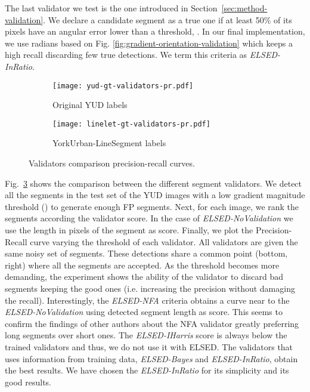 \documentclass[preprint,12pt]{elsarticle}
\begin{document}
The last validator we test is the one introduced in Section~\ref{sec:method-validation}.
We declare a candidate segment as a true one if at least 50\% of its pixels have an angular error lower than a threshold, . In our final implementation, we use  radians based on Fig. \ref{fig:gradient-orientation-validation} which keeps a high recall discarding few true detections. 
We term this criteria as \emph{ELSED-InRatio}.
\begin{figure}
    \centering
    \begin{subfigure}{0.49\textwidth}
        \centering
        \texttt{[image: yud-gt-validators-pr.pdf]}
        \label{fig:label:validation-criteria-original-yud}
        \caption{Original YUD labels}
    \end{subfigure}
    \begin{subfigure}{0.49\textwidth}
        \centering
        \texttt{[image: linelet-gt-validators-pr.pdf]}
        \label{fig:validation-criteria-original-linelet}
        \caption{YorkUrban-LineSegment labels}
    \end{subfigure}
    \caption{Validators comparison precision-recall curves.}
    \label{fig:validation-criteria-precision-recall}
\end{figure}

Fig.~\ref{fig:validation-criteria-precision-recall} shows the comparison between the different segment validators. We detect all the segments in the test set of the YUD images with a low gradient magnitude threshold () to generate enough FP segments. Next, for each image, we rank the segments according the validator score. In the case of \emph{ELSED-NoValidation} we use the length in pixels of the segment as score. Finally, we plot the Precision-Recall curve varying the threshold of each validator. 
All validators are given the same noisy set of segments. These detections share a common point (bottom, right) where all the segments are accepted. As the threshold becomes more demanding, the experiment shows the ability of the validator to discard bad segments keeping the good ones (i.e. increasing the precision without damaging the recall).
Interestingly, the \emph{ELSED-NFA} criteria obtains a curve near to the \emph{ELSED-NoValidation} using detected segment length as score. This seems to confirm the findings of other authors about the NFA validator greatly preferring long segments over short ones.
The \emph{ELSED-IHarris} score is always below the trained validators and thus, we do not use it with ELSED. 
The validators that uses information from training data, \emph{ELSED-Bayes} and \emph{ELSED-InRatio}, obtain the best results. We have chosen the \emph{ELSED-InRatio} for its simplicity and its good results.
\end{document}
